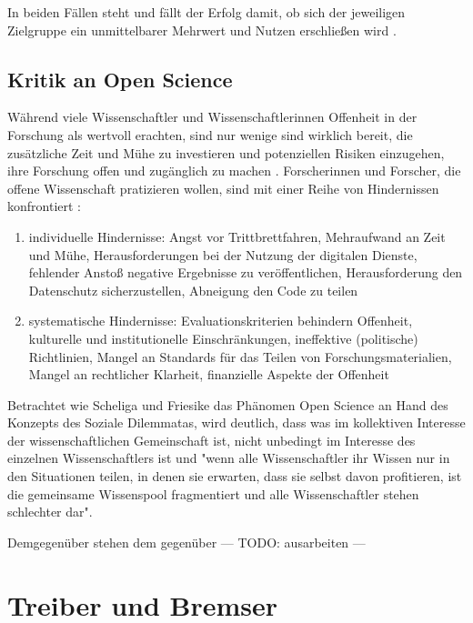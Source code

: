 In beiden Fällen steht und fällt der Erfolg damit, ob sich der jeweiligen Zielgruppe ein unmittelbarer Mehrwert und Nutzen erschließen wird \cite{schulze_2013_open}.

\subsection{Kritik an Open Science}

Während viele Wissenschaftler und Wissenschaftlerinnen Offenheit in der Forschung als wertvoll erachten, sind nur wenige sind wirklich bereit, die zusätzliche Zeit und Mühe zu investieren und potenziellen Risiken einzugehen, ihre Forschung offen und zugänglich zu machen \cite{Scheliga_2014} \cite{Procter_2010}. Forscherinnen und Forscher, die offene Wissenschaft pratizieren wollen, sind mit einer Reihe von Hindernissen konfrontiert \cite{Scheliga_2014}: 
\begin{enumerate}
\item individuelle Hindernisse: Angst vor Trittbrettfahren, Mehraufwand an Zeit und Mühe, Herausforderungen bei der Nutzung der digitalen Dienste, fehlender Anstoß negative Ergebnisse zu veröffentlichen, Herausforderung den Datenschutz sicherzustellen, Abneigung den Code zu teilen
\item systematische Hindernisse: Evaluationskriterien behindern Offenheit, kulturelle und institutionelle Einschränkungen, ineffektive (politische) Richtlinien, Mangel an Standards für das Teilen von Forschungsmaterialien, Mangel an rechtlicher Klarheit, finanzielle Aspekte der Offenheit
\end{enumerate}

Betrachtet wie Scheliga und Friesike das Phänomen Open Science an Hand des Konzepts des Soziale Dilemmatas, wird deutlich, dass was im kollektiven Interesse der wissenschaftlichen Gemeinschaft ist, nicht unbedingt im Interesse des einzelnen Wissenschaftlers ist und "wenn alle Wissenschaftler ihr Wissen nur in den Situationen teilen, in denen sie erwarten, dass sie selbst davon profitieren, ist die gemeinsame Wissenspool fragmentiert und alle Wissenschaftler stehen schlechter dar"\cite{Scheliga_2014}. 

Demgegenüber stehen dem gegenüber  --- TODO: ausarbeiten ---

\section{Treiber und Bremser}

